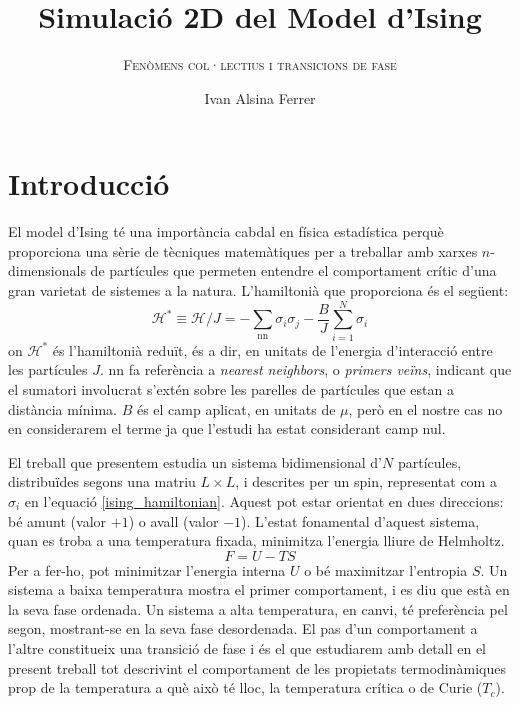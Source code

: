 \documentclass[a4paper]{article}
\title{\textbf{Simulació 2D del Model d'Ising}}
\subtitle{\scshape{Fenòmens col·lectius i transicions de fase}}
\author{Ivan Alsina Ferrer}
\date{}
\begin{document}
\maketitle
\vspace{-4em}
\section{Introducció}

El model d'Ising té una importància cabdal en física estadística perquè proporciona una sèrie de tècniques matemàtiques per a treballar amb xarxes $n$-dimensionals de partícules que permeten entendre el comportament crític d'una gran varietat de sistemes a la natura. L'hamiltonià que proporciona és el següent:
\begin{equation} \label{ising_hamiltonian}
    \mathcal{H}^* \equiv \mathcal{H}/J = -\sum_\text{nn} \sigma_i \sigma_j - \frac{B}{J} \sum_{i=1}^{N} \sigma_i
\end{equation}
on $\mathcal{H}^*$ és l'hamiltonià reduït, és a dir, en unitats de l'energia d'interacció entre les partícules $J$. nn fa referència a \textit{nearest neighbors}, o \textit{primers veïns}, indicant que el sumatori involucrat s'extén sobre les parelles de partícules que estan a distància mínima. $B$ és el camp aplicat, en unitats de $\mu$, però en el nostre cas no en considerarem el terme ja que l'estudi ha estat considerant camp nul.

El treball que presentem estudia un sistema bidimensional d'$N$ partícules, distribuïdes segons una matriu $L\times L$, i descrites per un spin, representat com a $\sigma_i$ en l'equació \eqref{ising_hamiltonian}. Aquest pot estar orientat en dues direccions: bé amunt (valor $+1$) o avall (valor $-1$). L'estat fonamental d'aquest sistema, quan es troba a una temperatura fixada, minimitza l'energia lliure de Helmholtz.
\begin{equation*}
    F = U - TS
\end{equation*}
Per a fer-ho, pot minimitzar l'energia interna $U$ o bé maximitzar l'entropia $S$. Un sistema a baixa temperatura mostra el primer comportament, i es diu que està en la seva fase ordenada. Un sistema a alta temperatura, en canvi, té preferència pel segon, mostrant-se en la seva fase desordenada. El pas d'un comportament a l'altre constitueix una transició de fase i és el que estudiarem amb detall en el present treball tot descrivint el comportament de les propietats termodinàmiques prop de la temperatura a què això té lloc, la temperatura crítica o de Curie ($T_c$).
\end{document}
